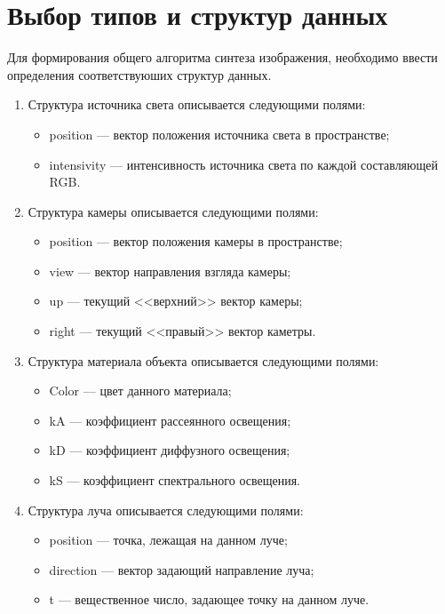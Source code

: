 \section{Выбор типов и структур данных}
Для формирования общего алгоритма синтеза изображения, необходимо ввести определения соответствуюших структур
данных.
\begin{enumerate}
	\item Структура источника света описывается следующими полями:
	\begin{itemize}
		\item position --- вектор положения источника света в пространстве;
		\item intensivity --- интенсивность источника света по каждой составляющей RGB.
	\end{itemize}
	
	\item Структура камеры описывается следующими полями:
	\begin{itemize}
		\item position --- вектор положения камеры в пространстве;
		\item view --- вектор направления взгляда камеры;
		\item up --- текущий <<верхний>> вектор камеры;
		\item right --- текущий <<правый>> вектор каметры.
	\end{itemize}
	
	\item Структура материала объекта описывается следующими полями:
	\begin{itemize}
		\item Color --- цвет данного материала;
		\item kA --- коэффициент рассеянного освещения;
		\item kD --- коэффициент диффузного освещения;
		\item kS --- коэффициент спектрального освещения.
	\end{itemize}
	
	
	\item Структура луча описывается следующими полями:
	\begin{itemize}
		\item position --- точка, лежащая на данном луче;
		\item direction --- вектор задающий направление луча;
		\item t --- вещественное число, задающее точку на данном луче.
	\end{itemize}
	

\end{enumerate}
